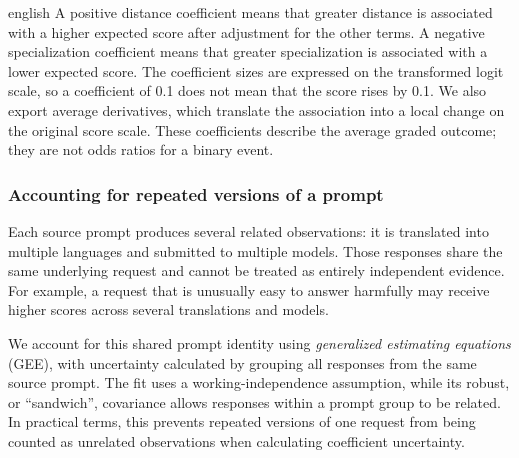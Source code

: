 \begin{otherlanguage*}{english}
A positive distance coefficient means that greater distance is associated with a higher expected score after adjustment for the other terms. A negative specialization coefficient means that greater specialization is associated with a lower expected score. The coefficient sizes are expressed on the transformed logit scale, so a coefficient of 0.1 does not mean that the score rises by 0.1. We also export average derivatives, which translate the association into a local change on the original score scale. These coefficients describe the average graded outcome; they are not odds ratios for a binary event.


\subsubsection{Accounting for repeated versions of a prompt}

Each source prompt produces several related observations: it is translated into multiple languages and submitted to multiple models. Those responses share the same underlying request and cannot be treated as entirely independent evidence. For example, a request that is unusually easy to answer harmfully may receive higher scores across several translations and models.


We account for this shared prompt identity using \emph{generalized estimating equations} (GEE), with uncertainty calculated by grouping all responses from the same source prompt. The fit uses a working-independence assumption, while its robust, or ``sandwich'', covariance allows responses within a prompt group to be related. In practical terms, this prevents repeated versions of one request from being counted as unrelated observations when calculating coefficient uncertainty.


\end{otherlanguage*}
